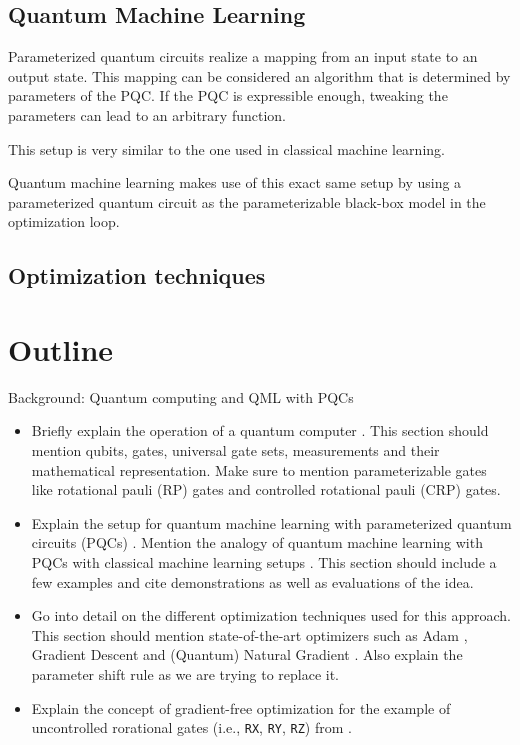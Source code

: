 \subsection{Quantum Machine Learning}
Parameterized quantum circuits realize a mapping from an input state to an
output state.
This mapping can be considered an algorithm that is determined by parameters of
the PQC.
If the PQC is expressible enough, tweaking the parameters can lead to an
arbitrary function.

This setup is very similar to the one used in classical machine learning.

Quantum machine learning makes use of this exact same setup by using a
parameterized quantum circuit as the parameterizable black-box model in the
optimization loop.

\subsection{Optimization techniques}

\section{Outline}
Background: Quantum computing and QML with PQCs
\begin{itemize}
    \item
        Briefly explain the operation of a quantum computer
        \cite{nielsen_quantum_2007}.
        This section should mention qubits, gates, universal gate sets,
        measurements and their mathematical representation.
        Make sure to mention parameterizable gates like rotational pauli (RP)
        gates and controlled rotational pauli (CRP) gates.
    \item
        Explain the setup for quantum machine learning with parameterized
        quantum circuits (PQCs) \cite{mitarai_quantum_2018}.
        Mention the analogy of quantum machine learning with PQCs with
        classical machine learning setups \cite{bishop_pattern_2006}.
        This section should include a few examples and cite demonstrations
        as well as evaluations of the idea.
    \item
        Go into detail on the different optimization techniques used for
        this approach.
        This section should mention state-of-the-art optimizers such as
        Adam \cite{kingma_adam_2017}, Gradient Descent and
        (Quantum) Natural Gradient \cite{stokes_quantum_2020}.
        Also explain the parameter shift rule
        \cite{mitarai_quantum_2018,schuld_evaluating_2019} as we are trying
        to replace it.
    \item
        Explain the concept of gradient-free optimization for the example of
        uncontrolled rorational gates (i.e., \texttt{RX}, \texttt{RY},
        \texttt{RZ}) from
        \cite{wendenius_gradient-free_2023,ostaszewski_structure_2021}.
\end{itemize}
